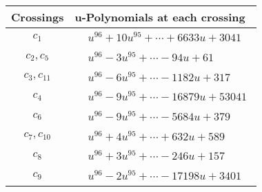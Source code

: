 \documentclass[1p]{elsarticle_modified}
\theoremstyle{definition}
\begin{document}
\begin{tabular}{m{50pt}|m{274pt}}
Crossings & \hspace{64pt}u-Polynomials at each crossing \\
\hline $$\begin{aligned}c_{1}\end{aligned}$$&$\begin{aligned}
&u^{96}+10 u^{95}+\cdots+6633 u+3041
\end{aligned}$\\
\hline $$\begin{aligned}c_{2},c_{5}\end{aligned}$$&$\begin{aligned}
&u^{96}-3 u^{95}+\cdots-94 u+61
\end{aligned}$\\
\hline $$\begin{aligned}c_{3},c_{11}\end{aligned}$$&$\begin{aligned}
&u^{96}-6 u^{95}+\cdots-1182 u+317
\end{aligned}$\\
\hline $$\begin{aligned}c_{4}\end{aligned}$$&$\begin{aligned}
&u^{96}-9 u^{95}+\cdots-16879 u+53041
\end{aligned}$\\
\hline $$\begin{aligned}c_{6}\end{aligned}$$&$\begin{aligned}
&u^{96}-9 u^{95}+\cdots-5684 u+379
\end{aligned}$\\
\hline $$\begin{aligned}c_{7},c_{10}\end{aligned}$$&$\begin{aligned}
&u^{96}+4 u^{95}+\cdots+632 u+589
\end{aligned}$\\
\hline $$\begin{aligned}c_{8}\end{aligned}$$&$\begin{aligned}
&u^{96}+3 u^{95}+\cdots-246 u+157
\end{aligned}$\\
\hline $$\begin{aligned}c_{9}\end{aligned}$$&$\begin{aligned}
&u^{96}-2 u^{95}+\cdots-17198 u+3401
\end{aligned}$\\
\hline
\end{tabular}\\~\\
\end{document}
